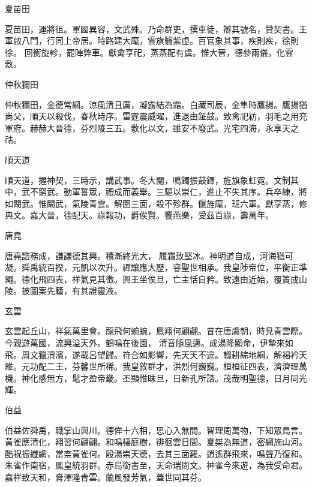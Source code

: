 \begin{pinyinscope}
 夏苗田



 夏苗田，運將徂。軍國異容，文武殊。乃命群吏，撰車徒，辯其號名，贊契書。王軍啟八門，行同上帝居。時路建大麾，雲旗翳紫虛。百官象其事，疾則疾，徐則徐。
 回衡旋軫，罷陣弊車。獻禽享祀，蒸蒸配有虞。惟大晉，德參兩儀，化雲敷。



 仲秋獮田



 仲秋獮田，金德常綱。涼風清且厲，凝露結為霜。白藏司辰，金隼時鷹揚。鷹揚猶尚父，順天以殺伐，春秋時序。雷霆震威曜，進退由鉦鼓。致禽祀祊，羽毛之用充軍府。赫赫大晉德，芬烈陵三五。敷化以文，雖安不廢武。光宅四海，永享天之祜。



 順天道



 順天道，握神契，三時示，講武事。冬大閱，鳴鐲振鼓鐸，旌旗象虹霓。文制其中，武不窮武。動軍誓眾，禮成而義舉。三驅以崇仁，進止不失其序。兵卒練，將如闞武。惟闞武，氣陵青雲。解圍三面，殺不殄群。偃旌麾，班六軍。獻享蒸，修典文。嘉大晉，德配天。祿報功，爵俟賢。饗燕樂，受茲百祿，壽萬年。



 唐堯



 唐堯諮務成，謙謙德其興。積漸終光大，
 履霜致堅冰。神明道自成，河海猶可凝。舜禹統百揆，元凱以次升。禪讓應大歷，睿聖世相承。我皇陟帝位，平衡正準繩。德化飛四表，祥氣見其徵。興王坐俟旦，亡主恬自矜。致遠由近始，覆簣成山陵。披圖案先籍，有其證靈液。



 玄雲



 玄雲起丘山，祥氣萬里會。龍飛何蜿蜿，鳳翔何翽翽。昔在唐虞朝，時見青雲際。今親遊萬國，流興溢天外。鶴鳴在後園，
 清音隨風邁。成湯隆顯命，伊摯來如飛。周文獵渭濱，遂載呂望歸。符合如影響，先天天不違。輟耕綜地綱，解褐衿天維。元功配二王，芬馨世所稀。我皇敘群才，洪烈何巍巍。桓桓征四表，濟濟理萬機。神化感無方，髦才盈帝畿。丕顯惟昧旦，日新孔所諮。茂哉明聖德，日月同光輝。



 伯益



 伯益佐舜禹，職掌山與川。德侔十六相，思心入無間。智理周萬物，下知眾鳥言。
 黃雀應清化，翔習何翩翩。和鳴棲庭樹，徘徊雲日間。夏桀為無道，密網施山河。酷祝振纖網，當柰黃雀何。殷湯崇天德，去其三面羅。逍遙群飛來，鳴聲乃復和。朱雀作南宿，鳳皇統羽群。赤烏銜書至，天命瑞周文。神雀今來遊，為我受命君。嘉祥致天和，膏澤隆青雲。蘭風發芳氣，蓋世同其芬。




\end{pinyinscope}
